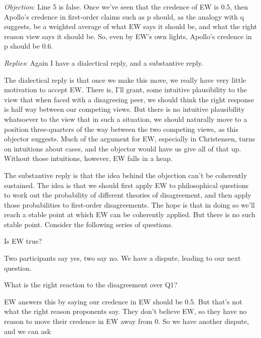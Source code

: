 \documentclass[
  10pt,
  letterpaper,
  DIV=11,
  numbers=noendperiod,
  twoside]{scrartcl}
\providecommand{\tightlist}{%
  \setlength{\itemsep}{0pt}\setlength{\parskip}{0pt}}\usepackage{longtable,booktabs,array}
\begin{document}
\emph{Objection}: Line 5 is false. Once we've seen that the credence of
EW is 0.5, then Apollo's credence in first-order claims such as p
should, as the analogy with q suggests, be a weighted average of what EW
says it should be, and what the right reason view says it should be. So,
even by EW's own lights, Apollo's credence in p should be 0.6.

\emph{Replies}: Again I have a dialectical reply, and a substantive
reply.

The dialectical reply is that once we make this move, we really have
very little motivation to accept EW. There is, I'll grant, some
intuitive plausibility to the view that when faced with a disagreeing
peer, we should think the right response is half way between our
competing views. But there is no intuitive plausibility whatsoever to
the view that in such a situation, we should naturally move to a
position three-quarters of the way between the two competing views, as
this objector suggests. Much of the argument for EW, especially in
Christensen, turns on intuitions about cases, and the objector would
have us give all of that up. Without those intuitions, however, EW falls
in a heap.

The substantive reply is that the idea behind the objection can't be
coherently sustained. The idea is that we should first apply EW to
philosophical questions to work out the probability of different
theories of disagreement, and then apply those probabilities to
first-order disagreements. The hope is that in doing so we'll reach a
stable point at which EW can be coherently applied. But there is no such
stable point. Consider the following series of questions.

\begin{description}
\tightlist
\item[Q1]
Is EW true?
\end{description}

Two participants say yes, two say no. We have a dispute, leading to our
next question.

\begin{description}
\tightlist
\item[Q2]
What is the right reaction to the disagreement over Q1?
\end{description}

EW answers this by saying our credence in EW should be 0.5. But that's
not what the right reason proponents say. They don't believe EW, so they
have no reason to move their credence in EW away from 0. So we have
another dispute, and we can ask
\end{document}
